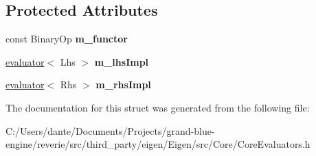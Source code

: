 \subsection*{Protected Attributes}
\begin{DoxyCompactItemize}
\item 
\mbox{\label{struct_eigen_1_1internal_1_1binary__evaluator_3_01_cwise_binary_op_3_01_binary_op_00_01_lhs_00_009c1543c08828196fc8ade7d79a56c66_ac4358c660a7d509e25be0c2f05aa88d9}} 
const Binary\+Op {\bfseries m\+\_\+functor}
\item 
\mbox{\label{struct_eigen_1_1internal_1_1binary__evaluator_3_01_cwise_binary_op_3_01_binary_op_00_01_lhs_00_009c1543c08828196fc8ade7d79a56c66_acc73348ccd1b0427bf21e8e56dd4a764}} 
\mbox{\hyperlink{struct_eigen_1_1internal_1_1evaluator}{evaluator}}$<$ Lhs $>$ {\bfseries m\+\_\+lhs\+Impl}
\item 
\mbox{\label{struct_eigen_1_1internal_1_1binary__evaluator_3_01_cwise_binary_op_3_01_binary_op_00_01_lhs_00_009c1543c08828196fc8ade7d79a56c66_a2779f6658304a42d22e7504bd7816b99}} 
\mbox{\hyperlink{struct_eigen_1_1internal_1_1evaluator}{evaluator}}$<$ Rhs $>$ {\bfseries m\+\_\+rhs\+Impl}
\end{DoxyCompactItemize}


The documentation for this struct was generated from the following file\+:\begin{DoxyCompactItemize}
\item 
C\+:/\+Users/dante/\+Documents/\+Projects/grand-\/blue-\/engine/reverie/src/third\+\_\+party/eigen/\+Eigen/src/\+Core/Core\+Evaluators.\+h\end{DoxyCompactItemize}
